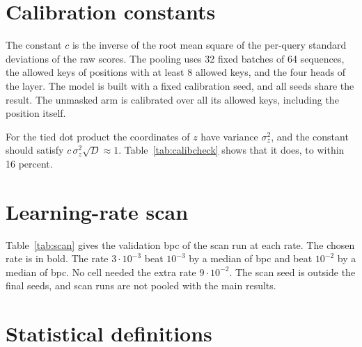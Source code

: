 \documentclass[11pt]{article}
\begin{document}
\section{Calibration constants}\label{app:calib}

The constant $c$ is the inverse of the root mean square of the per-query standard deviations of the raw scores.
The pooling uses 32 fixed batches of 64 sequences, the allowed keys of positions with at least 8 allowed keys, and the four heads of the layer.
The model is built with a fixed calibration seed, and all seeds share the result.
The unmasked arm is calibrated over all its allowed keys, including the position itself.

\begin{table}[h]
\centering\small

\caption{Calibration constant $c$ of layer 1 / layer 2, by arm and head size.}
\end{table}

For the tied dot product the coordinates of $z$ have variance $\sigma_z^2$, and the constant should satisfy $c\,\sigma_z^2\sqrt D\approx1$.
Table~\ref{tab:calibcheck} shows that it does, to within 16 percent.

\begin{table}[h]
\centering\small

\caption{The check $c\,\sigma_z^2\sqrt D$ for the tied dot product, by layer and head size.}
\label{tab:calibcheck}
\end{table}

\section{Learning-rate scan}\label{app:lr}

Table~\ref{tab:scan} gives the validation bpc of the scan run at each rate.
The chosen rate is in bold.
The rate $3\cdot10^{-3}$ beat $10^{-3}$ by a median of \marginOverThousandMedian{} bpc and beat $10^{-2}$ by a median of \marginOverTenMedian{} bpc.
No cell needed the extra rate $9\cdot10^{-2}$.
The scan seed is outside the final seeds, and scan runs are not pooled with the main results.

{\small

}
\begingroup{}\label{tab:scan}\endgroup

\section{Statistical definitions}\label{app:stats}
\end{document}
